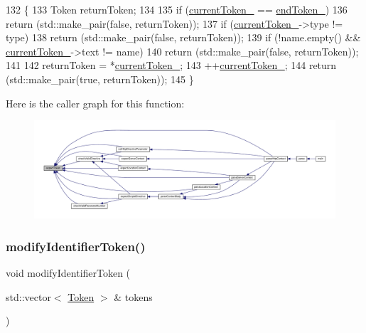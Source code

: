 \begin{DoxyCode}
132     \{
133         Token returnToken;
134 
135         \textcolor{keywordflow}{if} (\hyperlink{classft_1_1_parser_a942c5b794d108f144c5b5028aaa34cb6}{currentToken\_} == \hyperlink{classft_1_1_parser_a538ba3ab8ee1d0cef5cc3c999f3ab44c}{endToken\_})
136             \textcolor{keywordflow}{return} (std::make\_pair(\textcolor{keyword}{false}, returnToken));
137         \textcolor{keywordflow}{if} (\hyperlink{classft_1_1_parser_a942c5b794d108f144c5b5028aaa34cb6}{currentToken\_}->type != type)
138             \textcolor{keywordflow}{return} (std::make\_pair(\textcolor{keyword}{false}, returnToken));
139         \textcolor{keywordflow}{if} (!name.empty() && \hyperlink{classft_1_1_parser_a942c5b794d108f144c5b5028aaa34cb6}{currentToken\_}->text != name)
140             \textcolor{keywordflow}{return} (std::make\_pair(\textcolor{keyword}{false}, returnToken));
141 
142         returnToken = *\hyperlink{classft_1_1_parser_a942c5b794d108f144c5b5028aaa34cb6}{currentToken\_};
143         ++\hyperlink{classft_1_1_parser_a942c5b794d108f144c5b5028aaa34cb6}{currentToken\_};
144         \textcolor{keywordflow}{return} (std::make\_pair(\textcolor{keyword}{true}, returnToken));
145     \}
\end{DoxyCode}
Here is the caller graph for this function\+:
\nopagebreak
\begin{figure}[H]
\begin{center}
\leavevmode
\includegraphics[width=350pt]{classft_1_1_parser_a1615a752d3642bb53598e2c8db810db0_icgraph}
\end{center}
\end{figure}
\mbox{\label{classft_1_1_parser_a8226e5286bd1e9354998fe9e6bb63d08}} 
\subsubsection{\texorpdfstring{modify\+Identifier\+Token()}{modifyIdentifierToken()}}
{\footnotesize\ttfamily void modify\+Identifier\+Token (\begin{DoxyParamCaption}\item[{std\+::vector$<$ \hyperlink{classft_1_1_token}{Token} $>$ \&}]{tokens }\end{DoxyParamCaption})}



